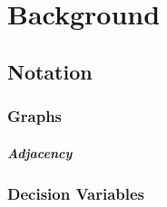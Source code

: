 \chapter{Background}
\label{chap:BG}

\section{Notation}
\label{sec:notation}

\subsection{Graphs}
\label{sec:notation:graphs}

\paragraph{Adjacency}
\subsection{Decision Variables}

